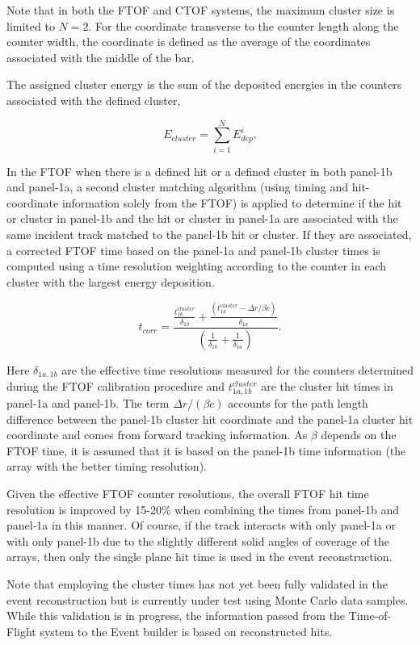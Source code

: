 \noindent
Note that in both the FTOF and CTOF systems, the maximum cluster size is limited to $N=2$. For the
coordinate transverse to the counter length along the counter width, the coordinate is defined as the average
of the coordinates associated with the middle of the bar.

The assigned cluster energy is the sum of the deposited energies in the counters associated with the defined
cluster,

\begin{equation}
  E_{cluster} = \sum_{i=1}^N E_{dep}^i.
\end{equation}

\noindent

In the FTOF when there is a defined hit or a defined cluster in both panel-1b and panel-1a, a second cluster matching
algorithm (using timing and hit-coordinate information solely from the FTOF) is applied to determine if the hit
or cluster in panel-1b and the hit or cluster in panel-1a are associated with the same incident track matched to
the panel-1b hit or cluster. If they are associated, a corrected FTOF time based on the panel-1a and panel-1b
cluster times is computed using a time resolution weighting according to the counter in each cluster with the
largest energy deposition.

\begin{equation}
  t_{corr} = \frac{\displaystyle \frac{\displaystyle t_{1b}^{cluster}}{\displaystyle \delta_{1b}} +
    \frac{\displaystyle (t_{1a}^{cluster} - \Delta r/\beta c)}{\displaystyle \delta_{1a}}}
  {\displaystyle \left( \frac{\displaystyle 1}{\displaystyle \delta_{1b}} +
    \frac{\displaystyle 1}{\displaystyle \delta_{1a}} \right)}.
\end{equation}

\noindent
Here $\delta_{1a,1b}$ are the effective time resolutions measured for the counters determined during the
FTOF calibration procedure and $t_{1a,1b}^{cluster}$ are the cluster hit times in panel-1a and panel-1b. The term
$\Delta r/(\beta c)$ accounts for the path length difference between the panel-1b cluster hit coordinate and
the panel-1a cluster hit coordinate and comes from forward tracking information. As $\beta$ depends on the
FTOF time, it is assumed that it is based on the panel-1b time information (the array with the better timing
resolution).

Given the effective FTOF counter resolutions, the overall FTOF hit time resolution is improved by 15-20\%
when combining the times from panel-1b and panel-1a in this manner. Of course, if the track interacts with only
panel-1a or with only panel-1b due to the slightly different solid angles of coverage of the arrays, then only the
single plane hit time is used in the event reconstruction. 

Note that employing the cluster times has not yet been fully validated in the event reconstruction but is currently under test using Monte Carlo data samples. While this validation is in progress,
the information passed from the Time-of-Flight system to the Event builder is based on reconstructed hits.
